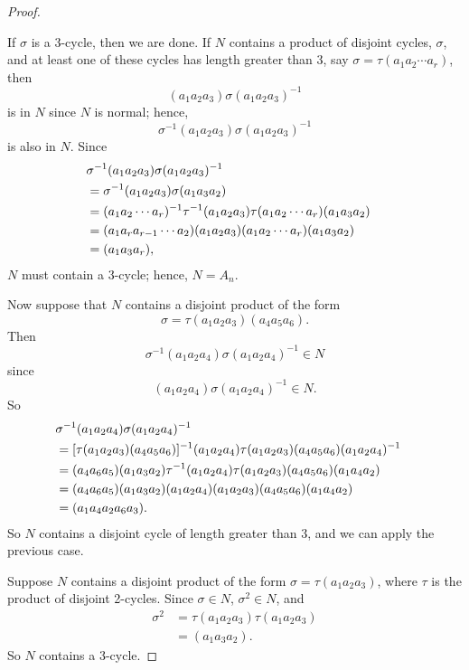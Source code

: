 {\begin{proof}
\begin{itemize}
 
\end{itemize}
If $\sigma$ is a $3$-cycle, then we are done. If $N$ contains a
product of disjoint cycles, $\sigma$, and at least one of these cycles
has length greater than 3, say $\sigma = \tau(a_1 a_2 \cdots a_r)$,
then   
\[
(a_1 a_2 a_3)\sigma(a_1 a_2 a_3)^{-1}
\]
is in $N$ since $N$ is normal; hence,
\[
\sigma^{-1}(a_1 a_2 a_3)\sigma(a_1 a_2 a_3)^{-1}
\]
is also in $N$. Since
\begin{align*}
\lefteqn{\sigma^{-1}(a_1 a_2 a_3)\sigma(a_1 a_2 a_3)^{-1} } \\
& = \sigma^{-1}(a_1 a_2 a_3)\sigma(a_1 a_3 a_2) \\
& = (a_1 a_2 \cdots a_r)^{-1}\tau^{-1}(a_1 a_2 a_3) 
      \tau(a_1 a_2 \cdots a_r)(a_1 a_3 a_2) \\
& = (a_1 a_r a_{r-1} \cdots a_2 )(a_1 a_2 a_3) 
      (a_1 a_2 \cdots a_r)(a_1 a_3 a_2) \\
& = (a_1 a_3 a_r),
\end{align*}
$N$ must contain a 3-cycle; hence, $N = A_n$.
 
 
 
 
Now suppose that $N$ contains a disjoint product of the form
\[
\sigma = \tau(a_1 a_2 a_3)(a_4 a_5 a_6).
\]
Then
\[
\sigma^{-1}(a_1 a_2 a_4)\sigma(a_1 a_2 a_4)^{-1} \in N
\]
since
\[
(a_1 a_2 a_4)\sigma(a_1 a_2 a_4)^{-1} \in N.
\]
So
\begin{align*}
\lefteqn{\sigma^{-1}(a_1 a_2 a_4)\sigma(a_1 a_2 a_4)^{-1} } \\
& = [ \tau (a_1 a_2 a_3) (a_4 a_5 a_6) ]^{-1}  (a_1 a_2 a_4) 
      \tau (a_1 a_2 a_3) (a_4 a_5 a_6) (a_1 a_2 a_4)^{-1} \\
& = (a_4 a_6 a_5) (a_1 a_3 a_2) \tau^{-1}(a_1 a_2 a_4)  
      \tau (a_1 a_2 a_3) (a_4 a_5 a_6) (a_1 a_4 a_2) \\
& = (a_4 a_6 a_5)(a_1 a_3 a_2) (a_1 a_2 a_4)
      (a_1 a_2 a_3) (a_4 a_5 a_6)(a_1 a_4 a_2) \\
& = (a_1 a_4 a_2 a_6 a_3).
\end{align*}
So $N$ contains a disjoint cycle of length greater than 3, and we can
apply the previous case. 
 
 
Suppose $N$ contains a disjoint product of the form $\sigma = \tau(a_1
a_2 a_3)$, where $\tau$ is the product of disjoint 2-cycles. Since
$\sigma \in N$, $\sigma^2 \in N$, and
\begin{align*}
\sigma^2
& = \tau(a_1 a_2 a_3)\tau(a_1 a_2 a_3) \\
& =(a_1 a_3 a_2).
\end{align*}
So $N$ contains a 3-cycle.
 

\end{proof}}
